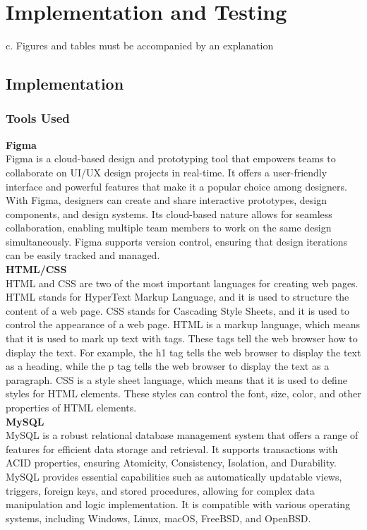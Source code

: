 \chapter{Implementation and Testing}





c. Figures and tables must be accompanied by an explanation
\section{Implementation}
\subsection{Tools Used}
\textbf{Figma}\\
Figma is a cloud-based design and prototyping tool that empowers teams to collaborate on UI/UX design projects in real-time. It offers a user-friendly interface and powerful features that make it a popular choice among designers. With Figma, designers can create and share interactive prototypes, design components, and design systems. Its cloud-based nature allows for seamless collaboration, enabling multiple team members to work on the same design simultaneously. Figma supports version control, ensuring that design iterations can be easily tracked and managed. \\
\textbf{HTML/CSS}\\
HTML and CSS are two of the most important languages for creating web pages. HTML stands for HyperText Markup Language, and it is used to structure the content of a web page. CSS stands for Cascading Style Sheets, and it is used to control the appearance of a web page.
HTML is a markup language, which means that it is used to mark up text with tags. These tags tell the web browser how to display the text. For example, the h1 tag tells the web browser to display the text as a heading, while the p tag tells the web browser to display the text as a paragraph.
CSS is a style sheet language, which means that it is used to define styles for HTML elements. These styles can control the font, size, color, and other properties of HTML elements.\\
\textbf{MySQL}\\
MySQL is a robust relational database management system that offers a range of features for efficient data storage and retrieval. It supports transactions with ACID properties, ensuring Atomicity, Consistency, Isolation, and Durability. MySQL provides essential capabilities such as automatically updatable views, triggers, foreign keys, and stored procedures, allowing for complex data manipulation and logic implementation. It is compatible with various operating systems, including Windows, Linux, macOS, FreeBSD, and OpenBSD. \\
